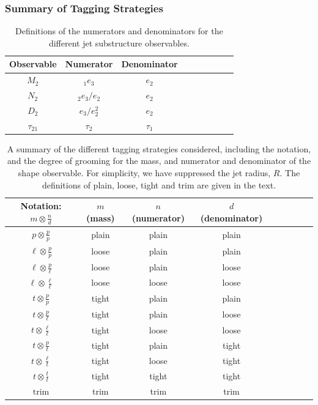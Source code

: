 \documentclass[11pt]{cernrep}
\begin{document}
\subsubsection{Summary of Tagging Strategies}\label{jetsub_2prong_sec:dichroic_sum}

\begin{table}
\begin{center}
\begin{tabular}{| c | c | c |c |c|c|c |c|r| }
  \hline                       
  Observable &  Numerator & Denominator \\
  \hline
  $M_2$ &   $_{1}e_{3}$ & $ e_{2}$ \\
  $N_2$ &   $_{2}e_{3} / e_{2} $ & $ e_{2}$ \\
  $D_2$ &   $e_{3} / e_{2}^2 $ & $ e_{2}$ \\
  $\tau_{21}$ &   $\tau_2$ & $\tau_1$ \\
  \hline  
\end{tabular}
\end{center}
\caption{
Definitions of the numerators and denominators for the different jet substructure observables.
}
\label{jetsub_2prong_tab:dn}
\end{table}

\begin{table}[t!]
\begin{center}
\begin{tabular}{| c | c | c |c |c|c|c |c|c | }
  \hline                       
  Notation: $m \otimes \frac{n}{d}$ & $m$ (mass) & $n$ (numerator) & $d$ (denominator)\\
  \hline
  $p \otimes \frac{p}{p}$ & plain  &  plain & plain \\
  $\ell \otimes \frac{p}{p}$ & loose  &  plain & plain \\
  $\ell \otimes \frac{p}{\ell}$ & loose  &  plain & loose \\
  $\ell \otimes \frac{\ell}{\ell}$ & loose  &  loose & loose \\
  $t \otimes \frac{p}{p}$ & tight  &  plain & plain \\
  $t \otimes \frac{p}{\ell}$ & tight  &  plain & loose \\
  $t \otimes \frac{\ell}{\ell}$ & tight  &  loose & loose \\
  $t \otimes \frac{p}{t}$ & tight  &  plain & tight \\
  $t \otimes \frac{\ell}{t}$ & tight  &  loose & tight \\
  $t \otimes \frac{t}{t}$ & tight  &  tight & tight \\
  \hline
  $\text{trim}$ & trim &  trim & trim \\
  \hline  
\end{tabular}
\end{center}
\caption{ A summary of the different tagging strategies considered,
  including the notation, and the degree of grooming for the mass, and
  numerator and denominator of the shape observable. For simplicity,
  we have suppressed the jet radius, $R$. The definitions of plain,
  loose, tight and trim are given in the text.}
\label{jetsub_2prong_tab:tag_summary}
\end{table}
\end{document}
